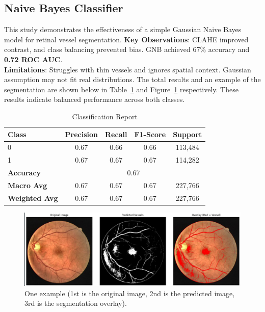 \documentclass[final]{article}
\begin{document}
\subsection{Naive Bayes Classifier}
This study demonstrates the effectiveness of a simple Gaussian Naive Bayes model for retinal vessel segmentation. \textbf{Key Observations}: CLAHE improved contrast, and class balancing prevented bias. GNB achieved 67\% accuracy and \textbf{0.72 ROC AUC}. \\
\textbf{Limitations}: Struggles with thin vessels and ignores spatial context. Gaussian assumption may not fit real distributions. The total results and an example of the segmentation are shown below in Table~\ref{tab:joe} and Figure~\ref{fig:joe} respectively. These results indicate balanced performance across both classes.
\begin{table}[H]
    \centering
    \caption{Classification Report}
    \begin{tabular}{lcccc}
    \toprule
    \textbf{Class} & \textbf{Precision} & \textbf{Recall} & \textbf{F1-Score} & \textbf{Support} \\
    \midrule
    0 & 0.67 & 0.66 & 0.66 & 113,484 \\
    1 & 0.67 & 0.67 & 0.67 & 114,282 \\
    \midrule
    \textbf{Accuracy} & \multicolumn{4}{c}{0.67} \\
    \textbf{Macro Avg} & 0.67 & 0.67 & 0.67 & 227,766 \\
    \textbf{Weighted Avg} & 0.67 & 0.67 & 0.67 & 227,766 \\
    \bottomrule
    \end{tabular}
    \label{tab:joe}
\end{table}
\vspace{-0.25cm}
\begin{figure}[H]
    \centering
    \centering
    \includegraphics[scale=0.25]{Figures/joe.png}
    \caption{One example (1st is the original image, 2nd is the predicted image, 3rd is the segmentation overlay).}
    \label{fig:joe}
\end{figure}
\end{document}
